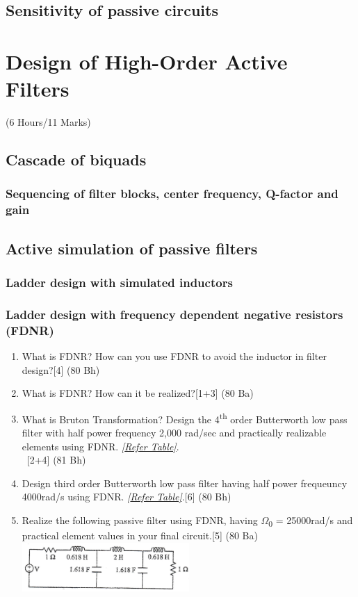 \documentclass[12pt]{article}
\newcommand{\W}{\(\Omega\)}
\newcommand{\enter}{\\\textcolor{white}{1}}
\begin{document}
\subsection{Sensitivity of passive circuits}

\pagebreak
\section{Design of High-Order Active Filters}
\begin{center}(6 Hours/11 Marks)\end{center}
\subsection{Cascade of biquads}
\subsubsection{Sequencing of filter blocks, center frequency, Q-factor and gain}
\subsection{Active simulation of passive filters}
\subsubsection{Ladder design with simulated inductors}
\subsubsection{Ladder design with frequency dependent negative resistors (FDNR)}
\begin{enumerate}
\item What is FDNR? How can you use FDNR to avoid the inductor in filter design?\hfill[4] (80 Bh)
\item What is FDNR? How can it be realized?\hfill [1+3] (80 Ba)
\item What is Bruton Transformation? Design the 4\textsuperscript{th} order Butterworth low pass filter with half power frequency 2,000 rad/sec and practically realizable elements using FDNR. \textit{[\hyperref[sec:tables_81bh]{Refer Table]}}.
\enter\hfill [2+4] (81 Bh)
\item Design third order Butterworth low pass filter having half power frequeuncy 4000rad/s using FDNR. \textit{[\hyperref[sec:tables_81bh]{Refer Table]}}.\hfill [6] (80 Bh)
\item Realize the following passive filter using FDNR, having \W\textsubscript{0} = 25000rad/s and practical element values in your final circuit.\hfill[5] (80 Ba)
\includegraphics[width=0.5\textwidth]{fd_4}
\end{enumerate}
\end{document}
